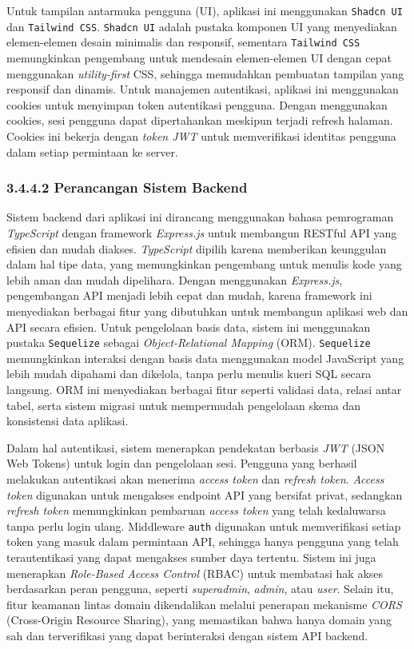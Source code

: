 Untuk tampilan antarmuka pengguna (UI), aplikasi ini menggunakan \texttt{Shadcn UI} dan \texttt{Tailwind CSS}. \texttt{Shadcn UI} adalah pustaka komponen UI yang menyediakan elemen-elemen desain minimalis dan responsif, sementara \texttt{Tailwind CSS} memungkinkan pengembang untuk mendesain elemen-elemen UI dengan cepat menggunakan \textit{utility-first} CSS, sehingga memudahkan pembuatan tampilan yang responsif dan dinamis. Untuk manajemen autentikasi, aplikasi ini menggunakan cookies untuk menyimpan token autentikasi pengguna. Dengan menggunakan cookies, sesi pengguna dapat dipertahankan meskipun terjadi refresh halaman. Cookies ini bekerja dengan \textit{token JWT} untuk memverifikasi identitas pengguna dalam setiap permintaan ke server. 

\subsubsection{3.4.4.2 Perancangan Sistem Backend}

Sistem backend dari aplikasi ini dirancang menggunakan bahasa pemrograman \textit{TypeScript} dengan framework \textit{Express.js} untuk membangun RESTful API yang efisien dan mudah diakses. \textit{TypeScript} dipilih karena memberikan keunggulan dalam hal tipe data, yang memungkinkan pengembang untuk menulis kode yang lebih aman dan mudah dipelihara. Dengan menggunakan \textit{Express.js}, pengembangan API menjadi lebih cepat dan mudah, karena framework ini menyediakan berbagai fitur yang dibutuhkan untuk membangun aplikasi web dan API secara efisien. Untuk pengelolaan basis data, sistem ini menggunakan pustaka \texttt{Sequelize} sebagai \textit{Object-Relational Mapping} (ORM). \texttt{Sequelize} memungkinkan interaksi dengan basis data menggunakan model JavaScript yang lebih mudah dipahami dan dikelola, tanpa perlu menulis kueri SQL secara langsung. ORM ini menyediakan berbagai fitur seperti validasi data, relasi antar tabel, serta sistem migrasi untuk mempermudah pengelolaan skema dan konsistensi data aplikasi.

Dalam hal autentikasi, sistem menerapkan pendekatan berbasis \textit{JWT} (JSON Web Tokens) untuk login dan pengelolaan sesi. Pengguna yang berhasil melakukan autentikasi akan menerima \textit{access token} dan \textit{refresh token}. \textit{Access token} digunakan untuk mengakses endpoint API yang bersifat privat, sedangkan \textit{refresh token} memungkinkan pembaruan \textit{access token} yang telah kedaluwarsa tanpa perlu login ulang. Middleware \texttt{auth} digunakan untuk memverifikasi setiap token yang masuk dalam permintaan API, sehingga hanya pengguna yang telah terautentikasi yang dapat mengakses sumber daya tertentu. Sistem ini juga menerapkan \textit{Role-Based Access Control} (RBAC) untuk membatasi hak akses berdasarkan peran pengguna, seperti \textit{superadmin}, \textit{admin}, atau \textit{user}. Selain itu, fitur keamanan lintas domain dikendalikan melalui penerapan mekanisme \textit{CORS} (Cross-Origin Resource Sharing), yang memastikan bahwa hanya domain yang sah dan terverifikasi yang dapat berinteraksi dengan sistem API backend.

